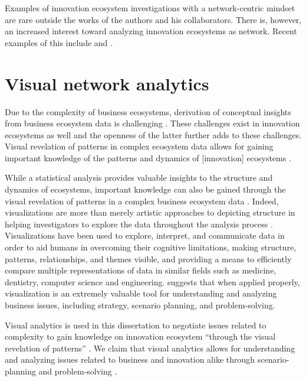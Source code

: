 Examples of innovation ecosystem investigations with a network-centric mindset are rare outside the works of the authors and his collaborators. There is, however, an increased interest toward analyzing innovation ecosystems as network. Recent examples of this include \cite{Clarysse2014CreatingEcosystems} and \cite{Parise2015HowIdeas}.

\section{Visual network analytics}

Due to the complexity of business ecosystems, derivation of conceptual insights from business ecosystem data is challenging \citep{Bizzi2012StudyingNetworks,Basole2015UnderstandingApproach}. These challenges exist in innovation ecosystems as well and the openness of the latter further adds to these challenges. Visual revelation of patterns in complex ecosystem data allows for gaining important knowledge of the patterns and dynamics of [innovation] ecosystems \citep{Basole2013UnderstandingVisualization}.

While a statistical analysis provides valuable insights to the structure and dynamics of ecosystems, important knowledge can also be gained through the visual revelation of patterns in a complex business ecosystem data \cite{Basole2013UnderstandingVisualization}. Indeed, visualizations are more than merely artistic approaches to depicting structure in helping investigators to explore the data throughout the analysis process \citep{Fox2011ChangingVisualization}. Visualizations have been used to explore, interpret, and communicate data in order to aid humans in overcoming their cognitive limitations, making structure, patterns, relationships, and themes visible, and providing a means to efficiently compare multiple representations of data in similar fields such as medicine, dentistry, computer science and engineering. \cite{Tufte1983VisualInformation} suggests that when applied properly, visualization is an extremely valuable tool for understanding and analyzing business issues, including strategy, scenario planning, and problem-solving.

Visual analytics is used in this dissertation to negotiate issues related to complexity to gain knowledge on innovation ecosystem ``through the visual revelation of patterns'' \citep{Basole2013UnderstandingVisualization}. We claim that visual analytics allows for understanding and analyzing issues related to business and innovation alike through scenario-planning and problem-solving \citep{Tufte1983VisualInformation}.

